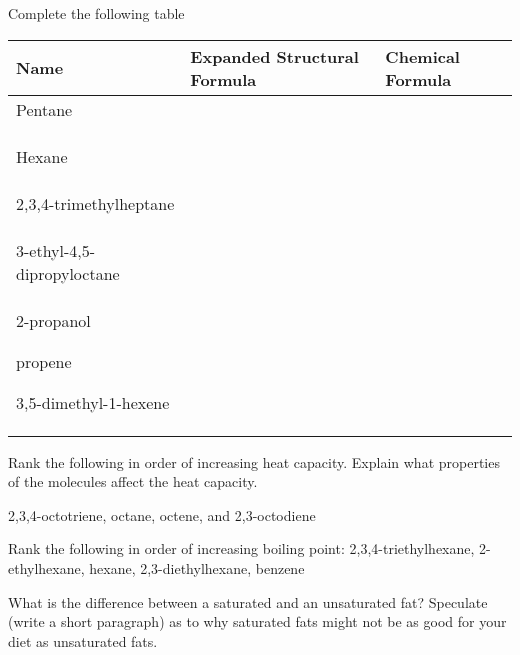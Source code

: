 \documentclass[addpoints, 12pt]{exam}
\begin{document}
\begin{questions}
\question[25] Complete the following table

\begin{tabular}{l|l|l}
Name & Expanded Structural Formula & Chemical Formula \\
\hline
Pentane & & \\
 & & \\
 & & \\
 & & \\
\hline
Hexane & & \\
& & \\ & & \\ & & \\ \hline
2,3,4-trimethylheptane & & \\
& & \\ & & \\ & & \\ \hline
3-ethyl-4,5-dipropyloctane & & \\
& & \\ & & \\ & & \\ \hline
2-propanol
& & \\ & & \\ & & \\ \hline
propene
& & \\ & & \\ & & \\ \hline
3,5-dimethyl-1-hexene & & \\
& & \\ & & \\ & & \\ \hline
\end{tabular}


\question[5] Rank the following in order of increasing heat capacity.
Explain what properties of the molecules affect the heat capacity.

2,3,4-octotriene, octane, octene, and 2,3-octodiene
\vspace{1cm}

\question[5] Rank the following in order of increasing boiling point:
2,3,4-triethylhexane, 2-ethylhexane, hexane, 2,3-diethylhexane, benzene 
\newpage




\question[5] What is the difference between a saturated and an
unsaturated fat?  Speculate (write a short paragraph) as to why
saturated fats might not be as good for your diet as unsaturated fats.

\vspace{1cm}


\end{questions}
\end{document}
